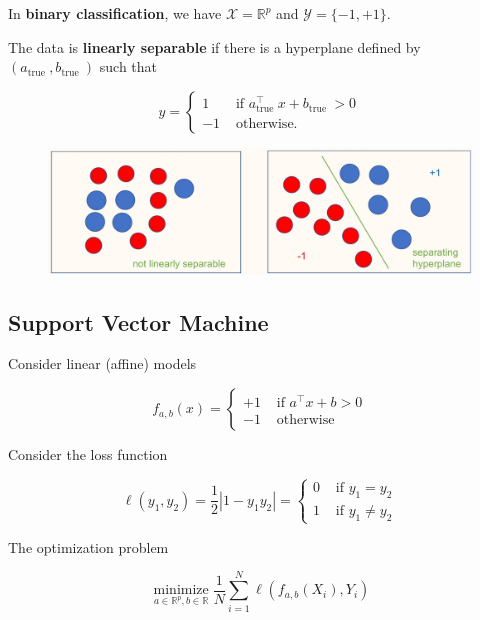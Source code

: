 \documentclass{report}
\begin{document}
\begin{definition}
    In \textbf{binary classification}, we have $\mathcal{X}=\mathbb{R}^{p}$ and $\mathcal{Y}=\{-1,+1\}$.

    The data is \textbf{linearly separable} if there is a hyperplane defined by $(a_{\text {true }}, b_{\text {true }} )$ such that

    $$
    y=\left\{\begin{array}{cl}
    1 & \text { if } a_{\text {true }}^{\top} x+b_{\text {true }}>0 \\
    -1 & \text { otherwise. }
    \end{array}\right.
    $$

    \begin{figure}[H]
        \centering
        \includegraphics[width=1.0\textwidth]{.././assets/3.1.jpg}
    \end{figure}
\end{definition}

\subsection{Support Vector Machine   }

Consider linear (affine) models

$$
f_{a, b}(x)= \begin{cases}+1 & \text { if } a^{\top} x+b>0 \\ -1 & \text { otherwise }\end{cases}
$$

Consider the loss function

$$
\ell\left(y_{1}, y_{2}\right)=\frac{1}{2}\left|1-y_{1} y_{2}\right|= \begin{cases}0 & \text { if } y_{1}=y_{2} \\ 1 & \text { if } y_{1} \neq y_{2}\end{cases}
$$

The optimization problem

$$
\underset{a \in \mathbb{R}^{p}, b \in \mathbb{R}}{\operatorname{minimize}} \frac{1}{N} \sum_{i=1}^{N} \ell\left(f_{a, b}\left(X_{i}\right), Y_{i}\right)
$$
\end{document}
